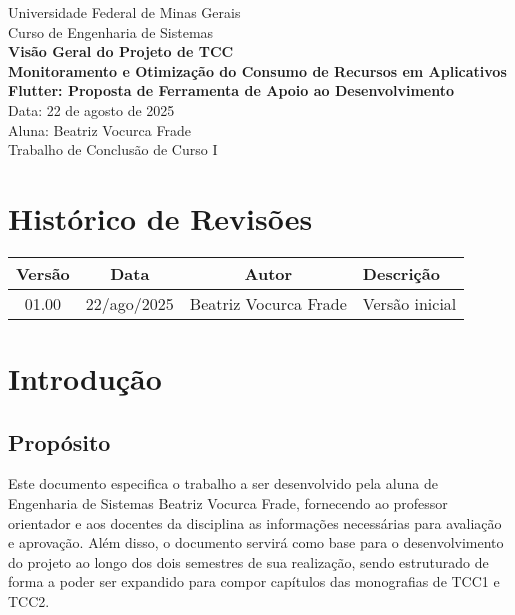 \documentclass[12pt,a4paper]{article}
\begin{document}
\begin{center}
\Large
Universidade Federal de Minas Gerais \\
Curso de Engenharia de Sistemas \\[3cm]

\textbf{\LARGE Visão Geral do Projeto de TCC} \\[1cm]

\textbf{Monitoramento e Otimização do Consumo de Recursos em Aplicativos Flutter: Proposta de Ferramenta de Apoio ao Desenvolvimento} \\[4cm]

Data: 22 de agosto de 2025 \\[4cm]

Aluna: Beatriz Vocurca Frade \\[3cm]

Trabalho de Conclusão de Curso I
\end{center}

\newpage

\section*{Histórico de Revisões}

\begin{longtable}{|c|c|c|p{7cm}|}
\hline
\textbf{Versão} & \textbf{Data} & \textbf{Autor} & \textbf{Descrição} \\ \hline
01.00 & 22/ago/2025 & Beatriz Vocurca Frade & Versão inicial \\ \hline
\end{longtable}

\newpage

\tableofcontents
\newpage

\section{Introdução}

\subsection{Propósito}
Este documento especifica o trabalho a ser desenvolvido pela aluna de Engenharia de Sistemas Beatriz Vocurca Frade, fornecendo ao professor orientador e aos docentes da disciplina as informações necessárias para avaliação e aprovação. Além disso, o documento servirá como base para o desenvolvimento do projeto ao longo dos dois semestres de sua realização, sendo estruturado de forma a poder ser expandido para compor capítulos das monografias de TCC1 e TCC2.
\end{document}
